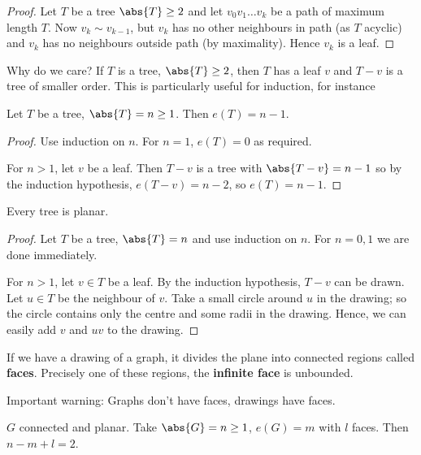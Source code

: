 \documentclass{article}
\begin{document}
\begin{proof}
    Let $T$ be a tree $\abs{T} \geq 2$ and let $v_0 v_1 \dotsc v_k$ be a path of maximum length $T$.
    Now $v_k \sim v_{k-1}$, but $v_k$ has no other neighbours in path (as $T$ acyclic) and $v_k$ has no neighbours outside path (by maximality).
    Hence $v_k$ is a leaf.
\end{proof}

Why do we care? If $T$ is a tree, $\abs{T} \geq 2$, then $T$ has a leaf $v$ and $T-v$ is a tree of smaller order.
This is particularly useful for induction, for instance

\begin{nprop}\label{prop:21}
    Let $T$ be a tree, $\abs{T} = n \geq 1$. Then $e(T) = n-1$.
\end{nprop}

\begin{proof}
    Use induction on $n$. For $n=1$, $e(T) = 0$ as required.

    For $n > 1$, let $v$ be a leaf. Then $T - v$ is a tree with $\abs{T - v} = n-1$ so by the induction hypothesis, $e(T-v) = n-2$, so $e(T) = n-1$.
\end{proof}

\begin{nprop}\label{prop:22}
    Every tree is planar.
\end{nprop}

\begin{proof}
    Let $T$ be a tree, $\abs{T} = n$ and use induction on $n$.  For $n=0,1$ we are done immediately.

    For $n > 1$, let $v \in T$ be a leaf. By the induction hypothesis, $T-v$ can be drawn.
    Let $u \in T$ be the neighbour of $v$.
    Take a small circle around $u$ in the drawing; so the circle contains only the centre and some radii in the drawing.
    Hence, we can easily add $v$ and $uv$ to the drawing.
\end{proof}

\begin{defi}[Faces]
    If we have a drawing of a graph, it divides the plane into connected regions called \textbf{faces}. Precisely one of these regions, the \textbf{infinite face} is unbounded.
\end{defi}
\begin{remark}
    Important warning: Graphs don't have faces, drawings have faces.
\end{remark}

\begin{nthm}\label{thm:23}
    $G$ connected and planar. Take $\abs{G} = n \geq 1$, $e(G) = m$ with $l$ faces. Then $n - m + l = 2$.
\end{nthm}
\end{document}
